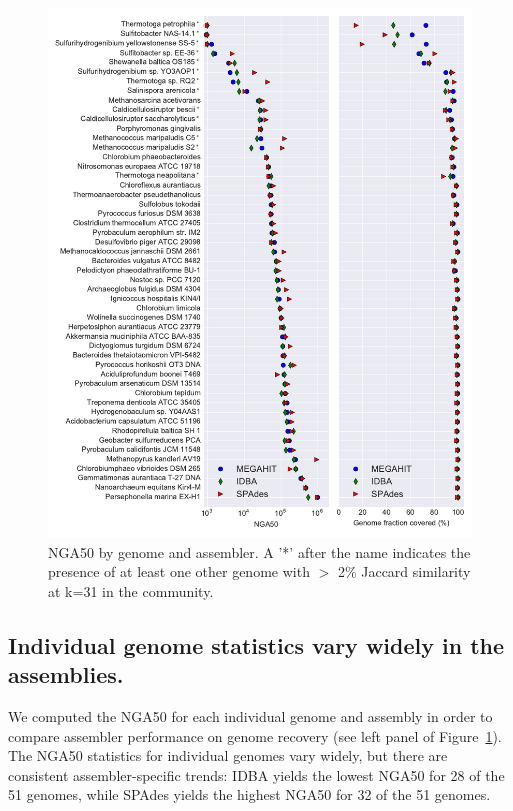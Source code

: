 \documentclass[11pt]{article}
\begin{document}
\newpage

\begin{figure}[!h]
\centering
\includegraphics[width=\textwidth]{combined.pdf}  
\caption{NGA50 by genome and assembler. A '*' after the name indicates the presence of at least one other genome with $>$ 2\% Jaccard similarity at k=31 in the community.}
\label{fig:nga50}
\end{figure}

\newpage

\subsection*{Individual genome statistics vary widely in the assemblies.}

We computed the NGA50 for each individual genome and assembly in order
to compare assembler performance on genome recovery (see left panel of
Figure~\ref{fig:nga50}).  The NGA50 statistics for individual genomes
vary widely, but there are consistent assembler-specific trends: IDBA
yields the lowest NGA50 for 28 of the 51 genomes, while SPAdes yields
the highest NGA50 for 32 of the 51 genomes.
\end{document}
